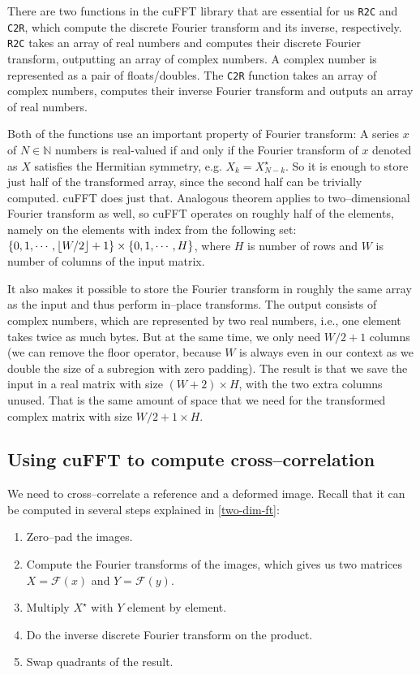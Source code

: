 There are two functions in the cuFFT library that are essential for us \texttt{R2C} and \texttt{C2R}, which compute the discrete Fourier transform and its inverse, respectively. \texttt{R2C} takes an array of real numbers and computes their discrete Fourier transform, outputting an array of complex numbers. A complex number is represented as a pair of floats/doubles. The \texttt{C2R} function takes an array of complex numbers, computes their inverse Fourier transform and outputs an array of real numbers.

Both of the functions use an important property of Fourier transform: A series $x$ of $N \in \mathbb{N}$ numbers is real-valued if and only if the Fourier transform of $x$ denoted as $X$ satisfies the Hermitian symmetry, e.g. $X_k = X_{N-k}^\star$. So it is enough to store just half of the transformed array, since the second half can be trivially computed. cuFFT does just that. Analogous theorem applies to two--dimensional Fourier transform as well, so cuFFT operates on roughly half of the elements, namely on the elements with index from the following set: $\{0,1,\cdots, \lfloor W/2\rfloor + 1\} \times \{0, 1, \cdots, H\}$, where $H$ is number of rows and $W$ is number of columns of the input matrix.

It also makes it possible to store the Fourier transform in roughly the same array as the input and thus perform in--place transforms. The output consists of complex numbers, which are represented by two real numbers, i.e., one element takes twice as much bytes. But at the same time, we only need $W/2 + 1$ columns (we can remove the floor operator, because $W$ is always even in our context as we double the size of a subregion with zero padding). The result is that we save the input in a real matrix with size $(W+2) \times H$, with the two extra columns unused. That is the same amount of space that we need for the transformed complex matrix with size $W/2 + 1 \times H$.

\subsection{Using cuFFT to compute cross--correlation}
\label{FFT-cross-corr-impl}

We need to cross--correlate a reference and a deformed image. Recall that it can be computed in several steps explained in \cref{two-dim-ft}:

\begin{enumerate}
	\item Zero--pad the images.
	\item Compute the Fourier transforms of the images, which gives us two matrices $X = \mathcal{F}(x)$ and $Y =\mathcal{F}(y)$.
	\item Multiply $X^\star$ with $Y$ element by element.
	\item Do the inverse discrete Fourier transform on the product.
	\item Swap quadrants of the result.
\end{enumerate}

